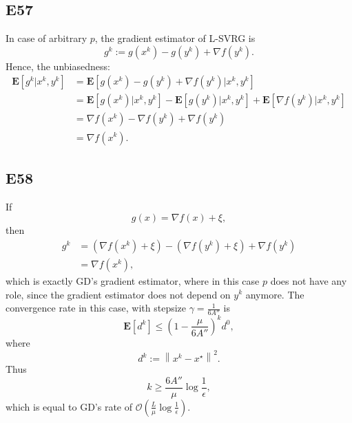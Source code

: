 \documentclass[12pt]{article}
\begin{document}
\subsection*{E57}
In case of arbitrary $p$, the gradient estimator of L-SVRG is
\begin{equation*}
    g^k := g(x^k) - g(y^k) + \nabla f(y^k).
\end{equation*}
Hence, the unbiasedness:
\begin{equation*}
    \begin{split}
        \mathbf{E}[g^k|x^k, y^k] &= \mathbf{E}[g(x^k) - g(y^k) + \nabla f(y^k)|x^k, y^k] \\
        &= \mathbf{E}[g(x^k)|x^k, y^k] - \mathbf{E}[g(y^k)|x^k, y^k] + \mathbf{E}[\nabla f(y^k)|x^k, y^k] \\
        &= \nabla f(x^k) - \nabla f(y^k) + \nabla f(y^k)\\
        &= \nabla f(x^k).
    \end{split}
\end{equation*}

\subsection*{E58}
If
\begin{equation*}
    g(x) = \nabla f(x) + \xi,
\end{equation*}
then
\begin{equation*}
    \begin{split}
        g^k &= (\nabla f(x^k) + \xi) - (\nabla f(y^k) + \xi) + \nabla f(y^k) \\
            &= \nabla f(x^k),
    \end{split}
\end{equation*}
which is exactly GD's gradient estimator, where in this case $p$ does not have any role, since the gradient estimator does not depend on $y^k$ anymore. 
The convergence rate in this case, with stepsize $\gamma = \frac{1}{6A''}$ is
\begin{equation*}
    \mathbf{E}[d^k] \leq \left(1 - \frac{\mu}{6A''}\right)^kd^0,
\end{equation*}
where
\begin{equation*}
    d^k := \left\| x^k - x^\star \right\|^2.
\end{equation*}
Thus
\begin{equation*}
    k \geq \frac{6A''}{\mu}\log\frac{1}{\epsilon},
\end{equation*}
which is equal to GD's rate of $\mathcal{O}\left(\frac{L}{\mu}\log\frac{1}{\epsilon}\right)$.
\end{document}
